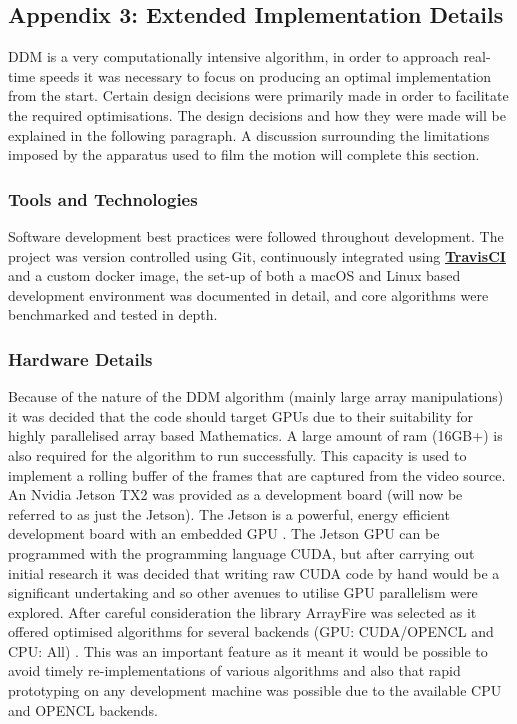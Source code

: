 \documentclass[10pt]{article}
\let\oldhref\href
\renewcommand{\href}[2]{\oldhref{#1}{\bfseries#2}}
\begin{document}
\subsection{Appendix 3: Extended Implementation Details}
\label{section:implementation}

DDM is a very computationally intensive algorithm, in order to approach real-time speeds it was necessary to focus on producing an optimal implementation from the start. Certain design decisions were primarily made in order to facilitate the required optimisations. The design decisions and how they were made will be explained in the following paragraph. A discussion surrounding the limitations imposed by the apparatus used to film the motion will complete this section.

\subsubsection{Tools and Technologies}
Software development best practices were followed throughout development. The project was version controlled using Git, continuously integrated using \href{https://travis-ci.com}{TravisCI} and a custom docker image, the set-up of both a macOS and Linux based development environment was documented in detail, and core algorithms were benchmarked and tested in depth.

\subsubsection{Hardware Details}
Because of the nature of the DDM algorithm (mainly large array manipulations) it was decided that the code should target GPUs due to their suitability for highly parallelised array based Mathematics. A large amount of ram (16GB+) is also required for the algorithm to run successfully. This capacity is used to implement a rolling buffer of the frames that are captured from the video source. An Nvidia Jetson TX2 was provided as a development board (will now be referred to as just the Jetson). The Jetson is a powerful, energy efficient development board with an embedded GPU \cite{jetson}. The Jetson GPU can be programmed with the programming language CUDA, but after carrying out initial research \cite{cuda_book} it was decided that writing raw CUDA code by hand would be a significant undertaking and so other avenues to utilise GPU parallelism were explored. After careful consideration the library ArrayFire was selected as it offered optimised algorithms for several backends (GPU: CUDA/OPENCL and CPU: All) \cite{arrayfire}. This was an important feature as it meant it would be possible to avoid timely re-implementations of various algorithms and also that rapid prototyping on any development machine was possible due to the available CPU and OPENCL backends.
\end{document}
